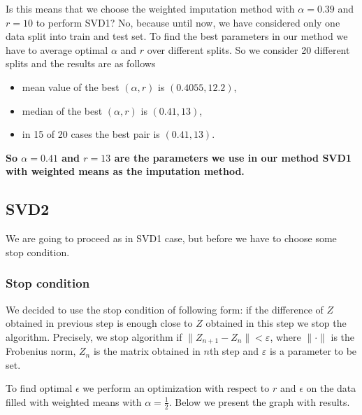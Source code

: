 \documentclass[11pt]{amsart}
\begin{document}
Is this means that we choose the weighted imputation method with $\alpha = 0.39$ and $r=10$ to perform SVD1?
No, because until now, we have considered only one data split into train and test set.
To find the best parameters in our method we have to average optimal $\alpha$ and $r$ over different splits.
So we consider 20 different splits and the results are as follows
\begin{itemize}
    \item mean value of the best $(\alpha, r)$ is $(0.4055, 12.2)$,
    \item median of the best $(\alpha, r)$ is $(0.41, 13)$,
    \item in 15 of 20 cases the best pair is $(0.41, 13)$.
\end{itemize}
\textbf{So $\alpha = 0.41$ and $r = 13$ are the parameters we use in our method SVD1 with weighted means as the imputation method.}







\subsection*{SVD2}
We are going to proceed as in SVD1 case, but before we have to choose some stop condition.

\subsubsection*{Stop condition}
We decided to use the stop condition of following form: if the difference of $Z$ obtained in previous step is enough close to $Z$ obtained in this step we stop the algorithm.
Precisely, we stop algorithm if $\|Z_{n+1} - Z_n\| < \varepsilon$, where $\|\cdot\|$ is the Frobenius norm, $Z_n$ is the matrix obtained in $n$th step and $\varepsilon$ is a parameter to be set.

To find optimal $\epsilon$ we perform an optimization with respect to $r$ and $\epsilon$
on the data filled with weighted means with $\alpha = \frac{1}{2}$.
Below we present the graph with results.
\end{document}
